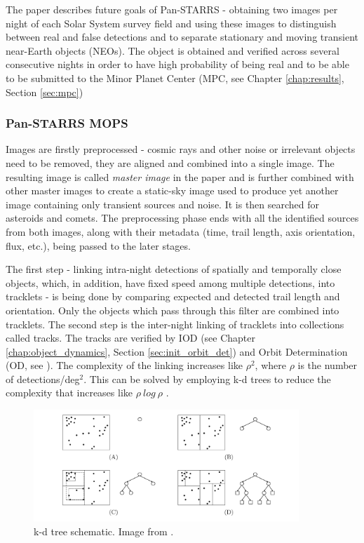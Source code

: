 	The paper describes future goals of Pan-STARRS - obtaining two images per night of each Solar System survey field and using these images to distinguish between real and false detections and to separate stationary and moving transient near-Earth objects (NEOs). The object is obtained and verified across several consecutive nights in order to have high probability of being real and to be able to be submitted to the Minor Planet Center (MPC, see Chapter \ref{chap:results}, Section \ref{sec:mpc})
	
\subsubsection{Pan-STARRS MOPS}
	
	Images are firstly preprocessed - cosmic rays and other noise or irrelevant objects need to be removed, they are aligned and combined into a single image. The resulting image is called \emph{master image} in the paper and is further combined with other master images to create a static-sky image used to produce yet another image containing only transient sources and noise. It is then searched for asteroids and comets. The preprocessing phase ends with all the identified sources from both images, along with their metadata (time, trail length, axis orientation, flux, etc.), being passed to the later stages.
	
	The first step - linking intra-night detections of spatially and temporally close objects, which, in addition, have fixed speed among multiple detections, into tracklets - is being done by comparing expected and detected trail length and orientation. Only the objects which pass through this filter are combined into tracklets. The second step is the inter-night linking of tracklets into collections called tracks. The tracks are verified by IOD (see Chapter \ref{chap:object_dynamics}, Section \ref{sec:init_orbit_det}) and Orbit Determination (OD, see \citep{klinkrad2006space}). The complexity of the linking increases like $\rho^2$, where $\rho$ is the number of detections/deg$^2$. This can be solved by employing k-d trees to reduce the complexity that increases like $\rho\ log\ \rho$ \citep{kubica}.
	
	\begin{figure}[H]
	\centering
	  \includegraphics[width=10cm]{images/kd_tree}
		  \caption{k-d tree schematic. Image from \citep{kubica}.}
	  \label{fig:kd_tree}
	\end{figure}
	

